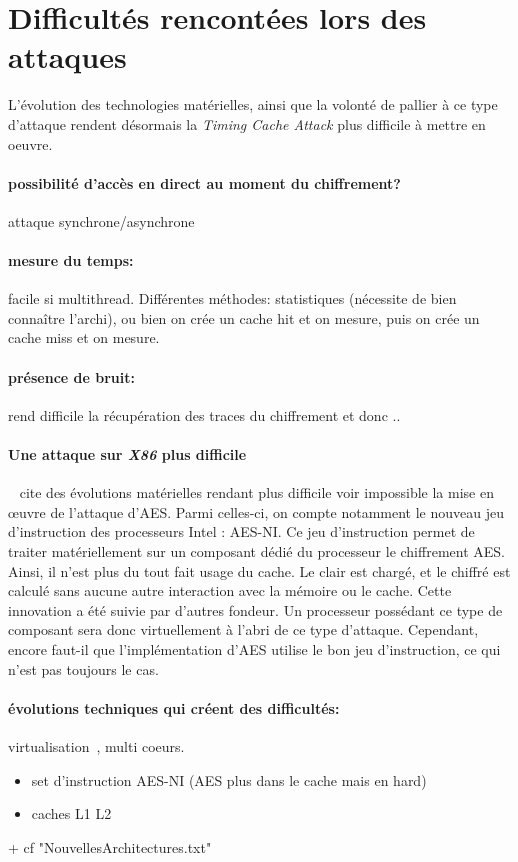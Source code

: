 \documentclass[a4paper,11pt]{article}
\begin{document}
\section{Difficultés rencontées lors des attaques} %

L'évolution des technologies matérielles, ainsi que la volonté de pallier à ce type d'attaque rendent désormais la \emph{Timing Cache Attack} plus difficile à mettre en  oeuvre.



\paragraph{possibilité d'accès en direct au moment du chiffrement?} attaque synchrone/asynchrone~\cite{osvik2006cache} %
\paragraph{mesure du temps:} facile si multithread. Différentes méthodes: statistiques (nécessite de bien connaître l'archi), ou bien on crée un cache hit et on mesure, puis on crée un cache miss et on mesure. %
\paragraph{présence de bruit:} rend difficile la récupération des traces du chiffrement et donc .. %
\paragraph{Une attaque sur \emph{X86} plus difficile}~\cite{mowery2012aes}  %
\cite{mowery2012aes} cite des évolutions matérielles rendant plus difficile voir impossible la mise en œuvre de l'attaque d'AES. Parmi celles-ci, on compte notamment le nouveau jeu d'instruction des processeurs Intel : AES-NI. Ce jeu d'instruction permet de traiter matériellement sur un composant dédié du processeur le chiffrement AES. Ainsi, il n'est plus du tout fait usage du cache. Le clair est chargé, et le chiffré est calculé sans aucune autre interaction avec la mémoire ou le cache.
Cette innovation a été suivie par d'autres fondeur. Un processeur possédant ce type de composant sera donc virtuellement à l'abri de ce type d'attaque. Cependant, encore faut-il que l'implémentation d'AES utilise le bon jeu d'instruction, ce qui n'est pas toujours le cas.
\paragraph{évolutions techniques qui créent des difficultés:} virtualisation~\cite{weiss2012cache}, multi coeurs.  %
\begin{itemize}
\item set d'instruction AES-NI (AES plus dans le cache mais en hard)
\item caches L1 L2
\end{itemize}
+ cf "NouvellesArchitectures.txt"
\end{document}
